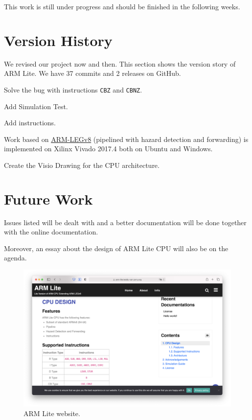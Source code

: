 \documentclass[11pt,fancy,bibstyle=ieee]{elegantbook}
\begin{document}
      This work is still under progress and should be finished in the following weeks.


\chapter{Version History}
We revised our project now and then. This section shows the version story of ARM Lite. We have 37 commits and 2 releases on GitHub.



\begin{change}
  \item Solve the bug with instructions \texttt{CBZ} and \texttt{CBNZ}.
  \item Add Simulation Test.
\end{change}


\begin{change}
  \item Add instructions.
\end{change}


\begin{change}
  \item Work based on \href{https://github.com/nxbyte/ARM-LEGv8}{ARM-LEGv8} (pipelined with hazard detection and forwarding) is implemented on Xilinx Vivado 2017.4 both on Ubuntu and Windows.
  \item Create the Visio Drawing for the CPU architecture.
\end{change}

\nocite{en2,en3}
\clearpage
{} %
\printbibliography

\appendix

\chapter{Future Work}

Issues listed will be dealt with and a better documentation will be done together with the online documentation.

Moreover, an essay about the design of ARM Lite CPU will also be on the agenda.

\begin{figure}[htbp]
  \centering
  \includegraphics[width=\linewidth]{image/website.png}
  \caption{ARM Lite website.}
\end{figure}
\end{document}
